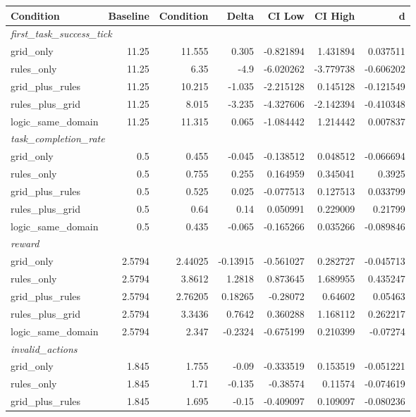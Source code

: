 \begin{tabular}{lrrrrrr}
\toprule
Condition & Baseline & Condition & Delta & CI Low & CI High & d \\
\midrule
  \multicolumn{7}{l}{\textit{first_task_success_tick}} \\
  grid_only & 11.25 & 11.555 & 0.305 & -0.821894 & 1.431894 & 0.037511 \\
  rules_only & 11.25 & 6.35 & -4.9 & -6.020262 & -3.779738 & -0.606202 \\
  grid_plus_rules & 11.25 & 10.215 & -1.035 & -2.215128 & 0.145128 & -0.121549 \\
  rules_plus_grid & 11.25 & 8.015 & -3.235 & -4.327606 & -2.142394 & -0.410348 \\
  logic_same_domain & 11.25 & 11.315 & 0.065 & -1.084442 & 1.214442 & 0.007837 \\
  \multicolumn{7}{l}{\textit{task_completion_rate}} \\
  grid_only & 0.5 & 0.455 & -0.045 & -0.138512 & 0.048512 & -0.066694 \\
  rules_only & 0.5 & 0.755 & 0.255 & 0.164959 & 0.345041 & 0.3925 \\
  grid_plus_rules & 0.5 & 0.525 & 0.025 & -0.077513 & 0.127513 & 0.033799 \\
  rules_plus_grid & 0.5 & 0.64 & 0.14 & 0.050991 & 0.229009 & 0.21799 \\
  logic_same_domain & 0.5 & 0.435 & -0.065 & -0.165266 & 0.035266 & -0.089846 \\
  \multicolumn{7}{l}{\textit{reward}} \\
  grid_only & 2.5794 & 2.44025 & -0.13915 & -0.561027 & 0.282727 & -0.045713 \\
  rules_only & 2.5794 & 3.8612 & 1.2818 & 0.873645 & 1.689955 & 0.435247 \\
  grid_plus_rules & 2.5794 & 2.76205 & 0.18265 & -0.28072 & 0.64602 & 0.05463 \\
  rules_plus_grid & 2.5794 & 3.3436 & 0.7642 & 0.360288 & 1.168112 & 0.262217 \\
  logic_same_domain & 2.5794 & 2.347 & -0.2324 & -0.675199 & 0.210399 & -0.07274 \\
  \multicolumn{7}{l}{\textit{invalid_actions}} \\
  grid_only & 1.845 & 1.755 & -0.09 & -0.333519 & 0.153519 & -0.051221 \\
  rules_only & 1.845 & 1.71 & -0.135 & -0.38574 & 0.11574 & -0.074619 \\
  grid_plus_rules & 1.845 & 1.695 & -0.15 & -0.409097 & 0.109097 & -0.080236 \\

\end{tabular}
